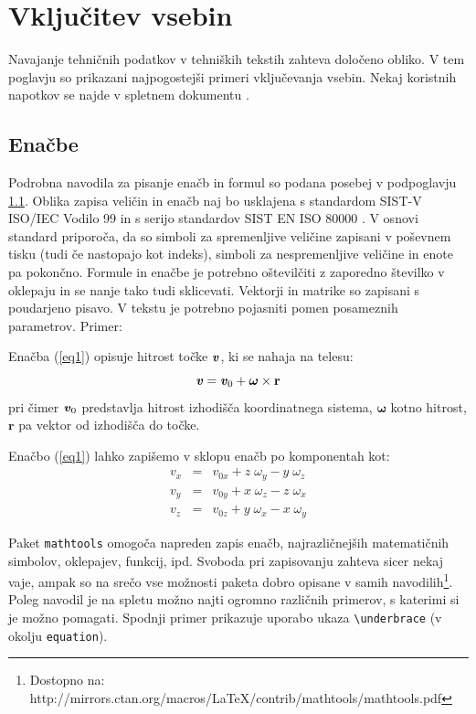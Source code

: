 \documentclass[a4paper,twoside,openright,12pt,slovene]{book}
\begin{document}
\section{Vključitev vsebin} \label{primeri_vsebin}

Navajanje tehničnih podatkov v tehniških tekstih zahteva določeno obliko. V tem poglavju so prikazani najpogostejši primeri vključevanja vsebin. Nekaj koristnih napotkov se najde v spletnem dokumentu \cite{murovec2013}.

\subsection{Enačbe} \label{vnos_enacb}

Podrobna navodila za pisanje enačb in formul so podana posebej v podpoglavju \ref{vnos_enacb}. Oblika zapisa veličin in enačb naj bo usklajena s standardom SIST-V ISO/IEC Vodilo 99 \cite{standard_sist_v} in s serijo standardov SIST EN ISO 80000 \cite{standard_sist_80000}. V osnovi standard priporoča, da so simboli za spremenljive veličine zapisani v poševnem tisku (tudi če nastopajo kot indeks), simboli za nespremenljive veličine in enote pa pokončno. Formule in enačbe je potrebno oštevilčiti z zaporedno številko v oklepaju in se nanje tako tudi sklicevati. Vektorji in matrike so zapisani s poudarjeno pisavo. V tekstu je potrebno pojasniti pomen posameznih parametrov. Primer:

Enačba (\ref{eq1}) opisuje hitrost točke $\textbf{\textit{v}}$, ki se nahaja na telesu:
\begin{equation} \label{eq1}
    \textbf{\textit{v}} = \textbf{\textit{v}}_0 + \boldsymbol{\omega} \times \mathbf{r}
\end{equation}
pri čimer $\textbf{\textit{v}}_0$ predstavlja hitrost izhodišča koordinatnega sistema, $\boldsymbol{\omega}$ kotno hitrost, $\mathbf{r}$ pa vektor od izhodišča do točke.

Enačbo (\ref{eq1}) lahko zapišemo v sklopu enačb po komponentah kot:
\begin{eqnarray} %
    v_x  &=& v_{0x} + z \;\omega_y - y \;\omega_z \nonumber \\
    v_y  &=& v_{0y} + x \;\omega_z - z \;\omega_x  \\
    v_z  &=& v_{0z} + y \;\omega_x - x \;\omega_y \nonumber
\end{eqnarray}

Paket \texttt{mathtools} omogoča napreden zapis enačb, najrazličnejših matematičnih simbolov, oklepajev, funkcij, ipd. Svoboda pri zapisovanju zahteva sicer nekaj vaje, ampak so na srečo vse možnosti paketa dobro opisane v samih navodilih\footnote{Dostopno na: http://mirrors.ctan.org/macros/LaTeX/contrib/mathtools/mathtools.pdf}. Poleg navodil je na spletu možno najti ogromno različnih primerov, s katerimi si je možno pomagati. Spodnji primer prikazuje uporabo ukaza \texttt{\textbackslash underbrace} (v okolju \texttt{equation}).
\end{document}
